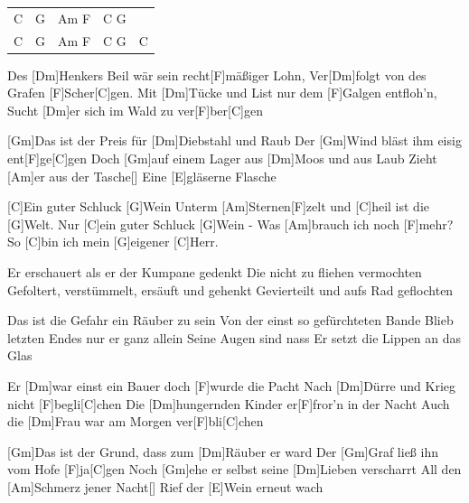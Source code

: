 

\begin{guitar}
	{\footnotesize\begin{tabular}{|l|l|l|l|l}
			C & G & Am F & C G & \\
			C & G & Am F & C G & C
	\end{tabular}}

	Des [Dm]Henkers Beil wär sein recht[F]mäßiger Lohn,
	Ver[Dm]folgt von des Grafen [F]Scher[C]gen.
	Mit [Dm]Tücke und List nur dem [F]Galgen entfloh'n,
	Sucht [Dm]er sich im Wald zu ver[F]ber[C]gen
	
	[Gm]Das ist der Preis für [Dm]Diebstahl und Raub
	Der [Gm]Wind bläst ihm eisig ent[F]ge[C]gen
	Doch [Gm]auf einem Lager aus [Dm]Moos und aus Laub
	Zieht [Am]er aus der Tasche[]{}
	Eine [E]gläserne Flasche
	
	\begin{highlightbar}
		[C]Ein guter Schluck [G]Wein
		Unterm [Am]Sternen[F]zelt und [C]heil ist die [G]Welt.
		Nur [C]ein guter Schluck [G]Wein -
		Was [Am]brauch ich noch [F]mehr? So [C]bin ich mein [G]eigener [C]Herr.
	\end{highlightbar}

	\songsection{Strophe 2}	
	Er erschauert als er der Kumpane gedenkt
	Die nicht zu fliehen vermochten
	Gefoltert, verstümmelt, ersäuft und gehenkt
	Gevierteilt und aufs Rad geflochten

	Das ist die Gefahr ein Räuber zu sein
	Von der einst so gefürchteten Bande
	Blieb letzten Endes nur er ganz allein
	Seine Augen sind nass
	Er setzt die Lippen an das Glas
	
	\begin{highlightbar}
		 \songsnippet{Ein guter Schluck Wein...}
	\end{highlightbar}
	\pagebreak
	Er [Dm]war einst ein Bauer doch [F]wurde die Pacht
	Nach [Dm]Dürre und Krieg nicht [F]begli[C]chen
	Die [Dm]hungernden Kinder er[F]fror'n in der Nacht
	Auch die [Dm]Frau war am Morgen ver[F]bli[C]chen

	[Gm]Das ist der Grund, dass zum [Dm]Räuber er ward
	Der [Gm]Graf ließ ihn vom Hofe [F]ja[C]gen
	Noch [Gm]ehe er selbst seine [Dm]Lieben verscharrt
	All den [Am]Schmerz jener Nacht[]{}
	Rief der [E]Wein erneut wach
	

\end{guitar}
